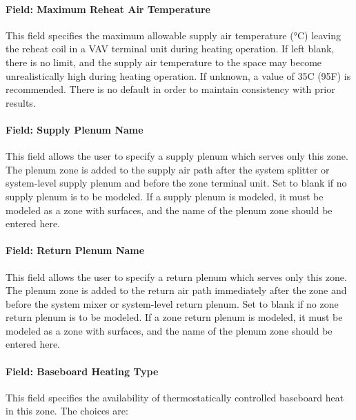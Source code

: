 \paragraph{Field: Maximum Reheat Air Temperature}\label{field-maximum-reheat-air-temperature-1-000}

This field specifies the maximum allowable supply air temperature (°C) leaving the reheat coil in a VAV terminal unit during heating operation. If left blank, there is no limit, and the supply air temperature to the space may become unrealistically high during heating operation. If unknown, a value of 35C (95F) is recommended. There is no default in order to maintain consistency with prior results.

\paragraph{Field: Supply Plenum Name}\label{field-supply-plenum-name-3}

This field allows the user to specify a supply plenum which serves only this zone. The plenum zone is added to the supply air path after the system splitter or system-level supply plenum and before the zone terminal unit. Set to blank if no supply plenum is to be modeled. If a supply plenum is modeled, it must be modeled as a zone with surfaces, and the name of the plenum zone should be entered here.

\paragraph{Field: Return Plenum Name}\label{field-return-plenum-name-3}

This field allows the user to specify a return plenum which serves only this zone. The plenum zone is added to the return air path immediately after the zone and before the system mixer or system-level return plenum. Set to blank if no zone return plenum is to be modeled. If a zone return plenum is modeled, it must be modeled as a zone with surfaces, and the name of the plenum zone should be entered here.

\paragraph{Field: Baseboard Heating Type}\label{field-baseboard-heating-type-9}

This field specifies the availability of thermostatically controlled baseboard heat in this zone. The choices are:

